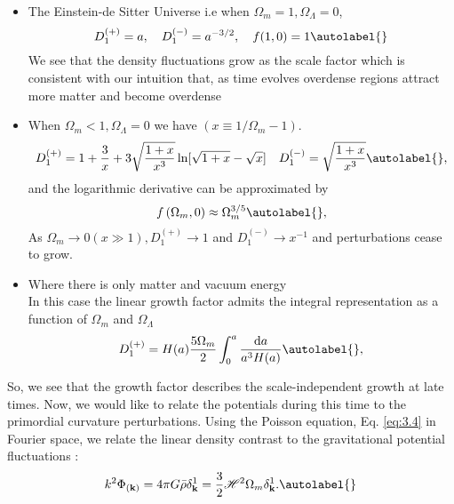 \begin{itemize}
    \item The Einstein-de Sitter Universe i.e when $\Omega_{m}=1, \Omega_{\Lambda}=0$,\\
    
    \begin{equation*}
        D_{1}^{(+)}=a, \quad D_{1}^{(-)}=a^{-3 / 2}, \quad f(1,0)=1 \autolabel{}
    \end{equation*}
    We see that the density fluctuations grow as the scale factor which is consistent with our intuition that, as time evolves overdense regions attract more matter and become overdense
    
    \item When $\Omega_{m}<1, \Omega_{\Lambda}=0$ we have $\left(x \equiv 1 / \Omega_{m}-1\right)$.\\
    
    \begin{equation*}
        D_{1}^{(+)}=1+\frac{3}{x}+3 \sqrt{\frac{1+x}{x^{3}}} \ln [\sqrt{1+x}-\sqrt{x}] \quad D_{1}^{(-)}=\sqrt{\frac{1+x}{x^{3}}} \autolabel{},
    \end{equation*}
    and the logarithmic derivative can be approximated by \cite{1976ApJ...205..318P}
    \begin{equation*}
        f\left(\Omega_{m}, 0\right) \approx \Omega_{m}^{3 / 5} \autolabel{},
    \end{equation*}
    As $\Omega_{m} \rightarrow 0(x \gg 1), D_{1}^{(+)} \rightarrow 1$ and $D_{1}^{(-)} \rightarrow x^{-1}$ and perturbations cease to grow.

    \item Where there is only matter and vacuum energy\\
    
    In this case the linear growth factor admits the integral representation as a function of $\Omega_{m}$ and $\Omega_{\Lambda}$
    \begin{equation*}
        D_{1}^{(+)}=H(a) \frac{5 \Omega_{m}}{2} \int_{0}^{a} \frac{\mathrm{d} a}{a^{3} H(a)} \autolabel{},
    \end{equation*}
\end{itemize}

So, we see that the growth factor describes the scale-independent growth at late times. Now, we would like to relate the potentials during this time to the primordial curvature perturbations. Using the Poisson equation, Eq. \eqref{eq:3.4} 
 in Fourier space, we relate the linear density contrast to the gravitational potential fluctuations :
\begin{align*}
    k^2 \Phi_{(\mathbf{k})}= 4 \pi G \bar{\rho} \delta^{1}_{\mathbf{k}}=\frac{3}{2}
    \mathcal{H}^2 \Omega_m \delta^{1}_{\mathbf{k}} .\autolabel{}
\end{align*}

